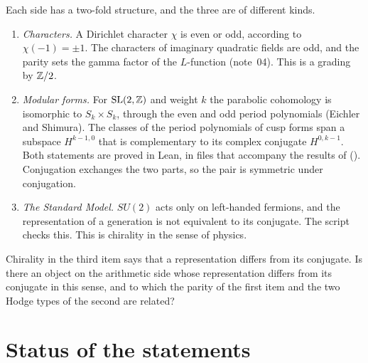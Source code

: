 \documentclass[11pt]{article}
\begin{document}
Each side has a two-fold structure, and the three are of different kinds.
\begin{enumerate}
\item \emph{Characters.} A Dirichlet character $\chi$ is even or odd, according to $\chi(-1)=\pm1$.
The characters of imaginary quadratic fields are odd, and the parity sets the gamma factor of the $L$-function (note~04).
This is a grading by $\mathbb{Z}/2$.
\item \emph{Modular forms.} For $\mathrm{SL}(2,\mathbb{Z})$ and weight $k$ the parabolic cohomology is isomorphic to $S_k\times S_k$, through the even and odd period polynomials (Eichler and Shimura).
The classes of the period polynomials of cusp forms span a subspace $H^{k-1,0}$ that is complementary to its complex conjugate $H^{0,k-1}$.
Both statements are proved in Lean, in files that accompany the results of \formal{} ().
Conjugation exchanges the two parts, so the pair is symmetric under conjugation.
\item \emph{The Standard Model.} $SU(2)$ acts only on left-handed fermions, and the representation of a generation is not equivalent to its conjugate.
The script checks this.
This is chirality in the sense of physics.
\end{enumerate}

\begin{question}\label{q:chiral}
Chirality in the third item says that a representation differs from its conjugate.
Is there an object on the arithmetic side whose representation differs from its conjugate in this sense, and to which the parity of the first item and the two Hodge types of the second are related?
\end{question}

\section*{Status of the statements}
\end{document}
